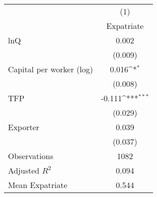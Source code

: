 {
\def\sym#1{\ifmmode^{#1}\else\(^{#1}\)\fi}
\begin{tabular}{l*{1}{c}}
\hline\hline
                    &\multicolumn{1}{c}{(1)}\\
                    &\multicolumn{1}{c}{Expatriate}\\
\hline
lnQ                 &       0.002         \\
                    &     (0.009)         \\
[1em]
Capital per worker (log)&       0.016\sym{*}  \\
                    &     (0.008)         \\
[1em]
TFP                 &      -0.111\sym{***}\\
                    &     (0.029)         \\
[1em]
Exporter            &       0.039         \\
                    &     (0.037)         \\
\hline
Observations        &        1082         \\
Adjusted \(R^{2}\)  &       0.094         \\
Mean Expatriate     &       0.544         \\
\hline\hline
\end{tabular}
}
